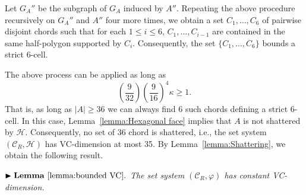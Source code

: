 \documentclass[a4paper]{article}
\newcommand{\C}{\ensuremath{{\mathcal C_R}}}
\newcommand{\G}{\ensuremath{G_{A}}}
\begin{document}
Let $\G''$ be the subgraph of $\G$ induced by $A''$. Repeating the above procedure recursively on $\G''$ and $A''$ four more times, we obtain a set $C_1, \ldots, C_6$ of pairwise disjoint chords such that for each $1\leq i\leq 6$, $C_1, \ldots, C_{i-1}$ are contained in the same half-polygon supported by $C_i$.
Consequently, the set $\{C_1, \ldots, C_6\}$ bounds a strict $6$-cell.

The above process can be applied as long as 
$$\left(\frac{9}{32}\right) \left(\frac{9}{16}\right)^4\kappa \geq 1.$$ 
That is, as long as $|A| \geq 36$ we can always find 6 such chords defining a strict $6$-cell. In this case, Lemma~\ref{lemma:Hexagonal face} implies that $A$ is not shattered by $\mathcal H$. Consequently, no set of 36 chord is shattered, i.e., the set system $(\C, \mathcal H)$ has VC-dimension at most 35.
By Lemma~\ref{lemma:Shattering}, we obtain the following result.

\vspace{.1in}
\noindent $\blacktriangleright \mathbf{Lemma~\ref{lemma:bounded VC}.}$ 
\emph{The set system $(\C, \varphi)$ has constant VC-dimension.
}
\end{document}
